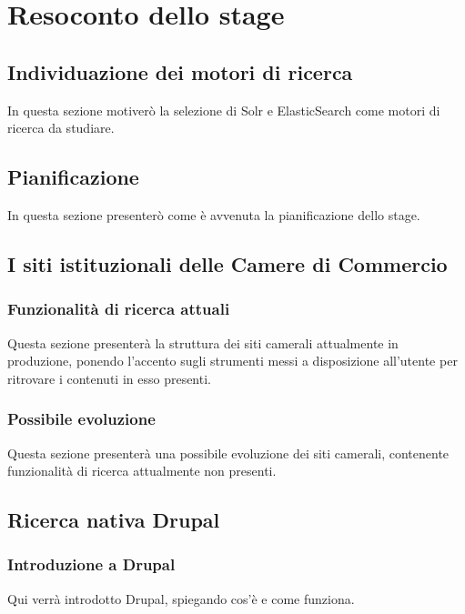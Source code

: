

\chapter{Resoconto dello stage}
\label{cap:resoconto_dello_stage}

	\section{Individuazione dei motori di ricerca}
	In questa sezione motiverò la selezione di Solr e ElasticSearch come motori di ricerca da studiare.

	\section{Pianificazione}
	In questa sezione presenterò come è avvenuta la pianificazione dello stage.
	
	\section{I siti istituzionali delle Camere di Commercio}

		\subsection{Funzionalità di ricerca attuali}
		Questa sezione presenterà la struttura dei siti camerali attualmente in produzione, ponendo l'accento sugli strumenti messi a disposizione all'utente per ritrovare i contenuti in esso presenti.
		
		\subsection{Possibile evoluzione}
		Questa sezione presenterà una possibile evoluzione dei siti camerali, contenente funzionalità di ricerca attualmente non presenti.

	\section{Ricerca nativa Drupal}

		\subsection{Introduzione a Drupal}
		Qui verrà introdotto Drupal, spiegando cos'è e come funziona.
		
